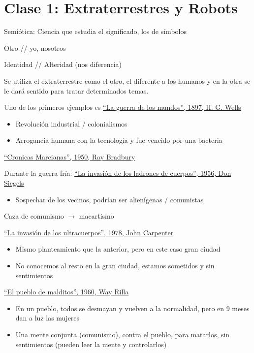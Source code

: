 \documentclass[12pt, twoside, openright]{report} %
\begin{document}
\chapter{Clase 1: Extraterrestres y Robots}
Semiótica: Ciencia que estudia el significado, los de símbolos

Otro // yo, nosotros

Identidad // Alteridad (nos diferencia)

Se utiliza el extraterrestre como el otro, el diferente a los humanos y en la otra se le dará sentido para tratar determinados temas.

Uno de los primeros ejemplos es \underline{\enquote{La guerra de los mundos}, 1897, H. G. Wells}
\begin{itemize}
	\item Revolución industrial / colonialismos
	\item Arrogancia humana con la tecnología y fue vencido por una bacteria
\end{itemize}

\underline{\enquote{Cronicas Marcianas}, 1950, Ray Bradbury}

Durante la guerra fría: \underline{\enquote{La invasión de los ladrones de cuerpos}, 1956, Don Siegels}
\begin{itemize}
	\item Sospechar de los vecinos, podrían ser alienígenas / comunistas
\end{itemize}

Caza de comunismo $\rightarrow$ macartismo

\underline{\enquote{La invasión de los ultracuerpos}, 1978, John Carpenter}
\begin{itemize}
	\item Mismo planteamiento que la anterior, pero en este caso gran ciudad
	\item No conocemos al resto en la gran ciudad, estamos sometidos y sin sentimientos
\end{itemize}

\underline{\enquote{El pueblo de malditos}, 1960, Way Rilla}
\begin{itemize}
	\item En un pueblo, todos se desmayan y vuelven a la normalidad, pero en 9 meses dan a luz las mujeres
	\item Una mente conjunta (comunismo), contra el pueblo, para matarlos, sin sentimientos (pueden leer la mente y controlarlos)
\end{itemize}
\end{document}
